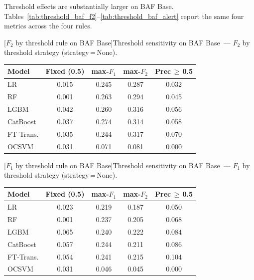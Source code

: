 Threshold effects are substantially larger on BAF Base. Tables~\ref{tab:threshold_baf_f2}--\ref{tab:threshold_baf_alert} report the same four metrics across the four rules.

\noindent\begin{minipage}{\linewidth}\centering
{}[$F_2$ by threshold rule on BAF Base]{Threshold sensitivity on BAF Base~--- $F_2$ by threshold strategy (strategy\,=\,None).}
\label{tab:threshold_baf_f2}
\begin{tabular}{l c c c c}
\toprule
Model & Fixed (0.5) & max-$F_1$ & max-$F_2$ & Prec\,$\geq$\,0.5 \\
\midrule
LR         & 0.015 & 0.245 & 0.287 & 0.032 \\
RF         & 0.001 & 0.263 & 0.294 & 0.045 \\
LGBM       & 0.042 & 0.260 & 0.316 & 0.056 \\
CatBoost   & 0.037 & 0.274 & 0.314 & 0.058 \\
FT-Trans.  & 0.035 & 0.244 & 0.317 & 0.070 \\
OCSVM      & 0.031 & 0.071 & 0.081 & 0.000 \\
\bottomrule
\end{tabular}
\end{minipage}

\noindent\begin{minipage}{\linewidth}\centering
{}[$F_1$ by threshold rule on BAF Base]{Threshold sensitivity on BAF Base~--- $F_1$ by threshold strategy (strategy\,=\,None).}
\label{tab:threshold_baf_f1}
\begin{tabular}{l c c c c}
\toprule
Model & Fixed (0.5) & max-$F_1$ & max-$F_2$ & Prec\,$\geq$\,0.5 \\
\midrule
LR         & 0.023 & 0.219 & 0.187 & 0.050 \\
RF         & 0.001 & 0.237 & 0.205 & 0.068 \\
LGBM       & 0.065 & 0.240 & 0.222 & 0.084 \\
CatBoost   & 0.057 & 0.244 & 0.211 & 0.086 \\
FT-Trans.  & 0.054 & 0.241 & 0.215 & 0.104 \\
OCSVM      & 0.031 & 0.046 & 0.045 & 0.000 \\
\bottomrule
\end{tabular}
\end{minipage}

